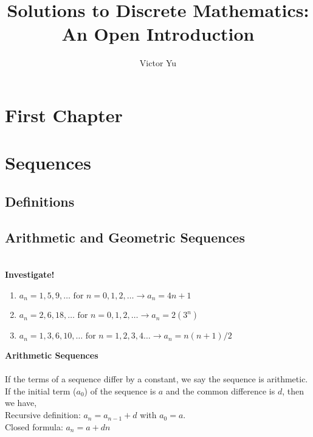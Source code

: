 \documentclass{article}
\title{Solutions to Discrete Mathematics: An Open Introduction}
\author{Victor Yu}
\begin{document}
	\maketitle
	
	\section{First Chapter}
	
	\section{Sequences}
	\subsection{Definitions}
	\subsection{Arithmetic and Geometric Sequences}
	\leavevmode \\
	\textbf{Investigate!}
	
	\begin{enumerate}
	
	\item $a_n = 1, 5, 9,\ldots \text{ for } n = 0, 1, 2,\ldots\rightarrow a_n = 4n + 1$\\

	\item $a_n = 2, 6, 18,\ldots \text{ for } n = 0, 1, 2,\ldots\rightarrow a_n = 2(3^n)$\\
	
	\item $a_n = 1, 3, 6, 10,\ldots \text{ for } n = 1, 2, 3, 4\ldots\rightarrow a_n = n(n+1)/2$\\
	\end{enumerate}
	
	\begin{tcolorbox}
	\noindent\textbf{Arithmetic Sequences}
	\\
	\\
	If the terms of a sequence differ by a constant, we say the sequence is arithmetic. If the initial term ($a_0$) of the sequence is $a$ and the common difference is $d$, then we have,\\
	
	\noindent Recursive definition: $a_n = a_{n-1} + d$ with $a_0 = a$.\\
	
	\noindent Closed formula: $a_n = a + dn$
	
	\end{tcolorbox}
	\leavevmode \\
	
\end{document}
